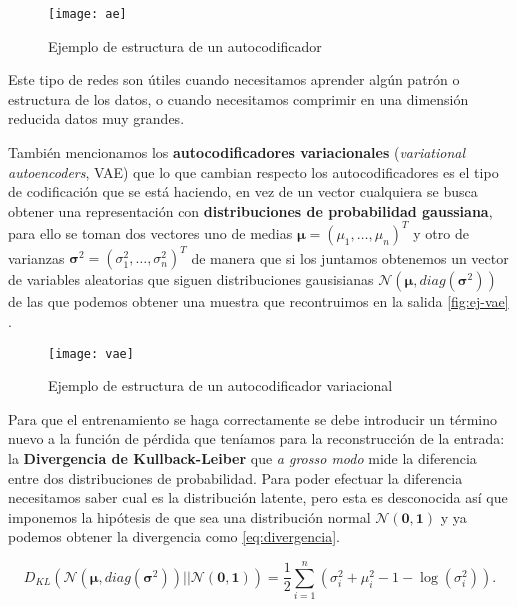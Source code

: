 \begin{figure}[htpb]
  \centering
  \texttt{[image: ae]}
  \caption{Ejemplo de estructura de un autocodificador}
  \label{fig:ej-ae}
\end{figure}

Este tipo de redes son útiles cuando necesitamos aprender algún patrón o estructura de los datos, o cuando necesitamos comprimir en una dimensión reducida datos muy grandes.

También mencionamos los \textbf{autocodificadores variacionales} (\emph{variational autoencoders}, VAE) que lo que cambian respecto los autocodificadores es el tipo de codificación que se está haciendo, en vez de un vector cualquiera
se busca obtener una representación con \textbf{distribuciones de probabilidad gaussiana}, para ello se toman dos vectores uno de medias $\pmb{\mu} = (\mu_1, \ldots, \mu_n)^T$ y otro de varianzas $\pmb{\sigma}^2 = (\sigma_1^2, \ldots, \sigma_n^2)^T$ de manera que si los juntamos obtenemos un vector de variables aleatorias que siguen distribuciones gausisianas $\mathcal{N}(\pmb{\mu}, diag(\pmb{\sigma}^2))$ de las que podemos obtener una muestra que recontruimos en la salida \autoref{fig:ej-vae} \cite{sancho2020ae}.

\begin{figure}[htpb]
  \centering
  \texttt{[image: vae]}
  \caption{Ejemplo de estructura de un autocodificador variacional}
  \label{fig:ej-vae}
\end{figure}

Para que el entrenamiento se haga correctamente se debe introducir un término nuevo a la función de pérdida que teníamos para la reconstrucción de la entrada: la \textbf{Divergencia de Kullback-Leiber} \cite{kullback1951information} que \emph{a grosso modo} mide la diferencia entre dos distribuciones de probabilidad. Para poder efectuar la diferencia necesitamos saber cual es la distribución latente, pero esta es desconocida así que imponemos la hipótesis de que sea una distribución normal $\mathcal{N}(\textbf{0}, \textbf{1})$ y ya podemos obtener la divergencia como \eqref{eq:divergencia}.

\begin{equation}
  D_{KL}(\mathcal{N}(\pmb{\mu}, diag(\pmb{\sigma}^2)) || \mathcal{N}(\textbf{0}, \textbf{1})) = \dfrac{1}{2} \sum^{n}_{i = 1} \left(\sigma^2_i + \mu^2_i - 1 - \log(\sigma^2_i) \right).
  \label{eq:divergencia}
\end{equation}

